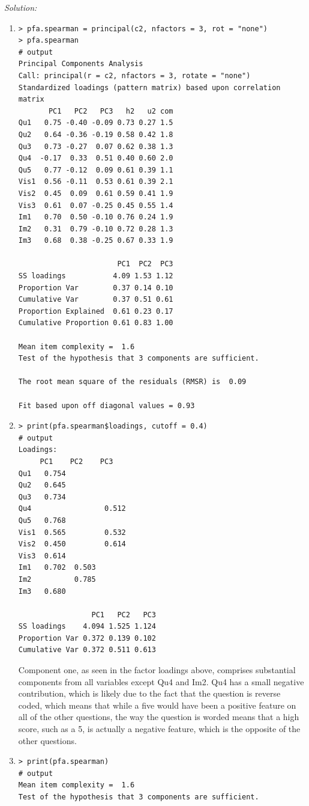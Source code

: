 \documentclass{article}
\newenvironment{solution}
    {\textit{Solution:}}
    {}
\begin{document}
\begin{solution}
\begin{enumerate}
\newpage
\item\mbox{}
	\begin{lstlisting}
> pfa.spearman = principal(c2, nfactors = 3, rot = "none")
> pfa.spearman
# output
Principal Components Analysis
Call: principal(r = c2, nfactors = 3, rotate = "none")
Standardized loadings (pattern matrix) based upon correlation matrix
       PC1   PC2   PC3   h2   u2 com
Qu1   0.75 -0.40 -0.09 0.73 0.27 1.5
Qu2   0.64 -0.36 -0.19 0.58 0.42 1.8
Qu3   0.73 -0.27  0.07 0.62 0.38 1.3
Qu4  -0.17  0.33  0.51 0.40 0.60 2.0
Qu5   0.77 -0.12  0.09 0.61 0.39 1.1
Vis1  0.56 -0.11  0.53 0.61 0.39 2.1
Vis2  0.45  0.09  0.61 0.59 0.41 1.9
Vis3  0.61  0.07 -0.25 0.45 0.55 1.4
Im1   0.70  0.50 -0.10 0.76 0.24 1.9
Im2   0.31  0.79 -0.10 0.72 0.28 1.3
Im3   0.68  0.38 -0.25 0.67 0.33 1.9

                       PC1  PC2  PC3
SS loadings           4.09 1.53 1.12
Proportion Var        0.37 0.14 0.10
Cumulative Var        0.37 0.51 0.61
Proportion Explained  0.61 0.23 0.17
Cumulative Proportion 0.61 0.83 1.00

Mean item complexity =  1.6
Test of the hypothesis that 3 components are sufficient.

The root mean square of the residuals (RMSR) is  0.09 

Fit based upon off diagonal values = 0.93
	\end{lstlisting}
\newpage
\item\mbox{}
	\begin{lstlisting}
> print(pfa.spearman$loadings, cutoff = 0.4)
# output
Loadings:
     PC1    PC2    PC3   
Qu1   0.754              
Qu2   0.645              
Qu3   0.734              
Qu4                 0.512
Qu5   0.768              
Vis1  0.565         0.532
Vis2  0.450         0.614
Vis3  0.614              
Im1   0.702  0.503       
Im2          0.785       
Im3   0.680              

                 PC1   PC2   PC3
SS loadings    4.094 1.525 1.124
Proportion Var 0.372 0.139 0.102
Cumulative Var 0.372 0.511 0.613
	\end{lstlisting}
Component one, as seen in the factor loadings above, comprises substantial components from all variables except Qu4 and Im2. Qu4 has a small negative contribution, which is likely due to the fact that the question is reverse coded, which means that while a five would have been a positive feature on all of the other questions, the way the question is worded means that a high score, such as a 5, is actually a negative feature, which is the opposite of the other questions.
\item\mbox{}
	\begin{lstlisting}
> print(pfa.spearman) 
# output
Mean item complexity =  1.6
Test of the hypothesis that 3 components are sufficient.


\end{lstlisting}
\end{enumerate}
\end{solution}
\end{document}
